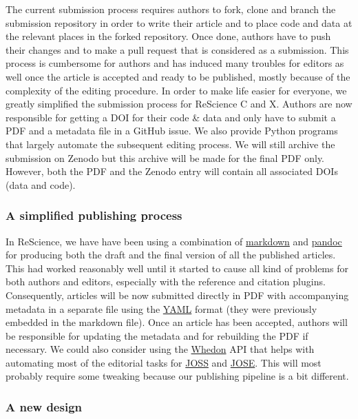 The current submission process requires authors to fork, clone and branch the
submission repository in order to write their article and to place code and
data at the relevant places in the forked repository. Once done, authors have
to push their changes and to make a pull request that is considered as a
submission. This process is cumbersome for authors and has induced many
troubles for editors as well once the article is accepted and ready to be
published, mostly because of the complexity of the editing procedure. In order
to make life easier for everyone, we greatly simplified the submission process
for ReScience C and X. Authors are now responsible for getting a DOI for their
code \& data and only have to submit a PDF and a metadata file in a GitHub
issue.
We also provide Python programs that largely automate the subsequent editing
process. We will still archive the submission on Zenodo but this archive will
be made for the final PDF only. However, both the PDF and the Zenodo entry will
contain all associated DOIs (data and code).


\subsubsection{A simplified publishing process}

In ReScience, we have have been using a combination of
\href{https://daringfireball.net/projects/markdown/syntax}{markdown} and
\href{http://pandoc.org/}{pandoc} for producing both the draft and the final
version of all the published articles. This had worked reasonably well until it
started to cause all kind of problems for both authors and editors, especially
with the reference and citation plugins. Consequently, articles will be now
submitted directly in PDF with accompanying metadata in a separate file using
the \href{https://en.wikipedia.org/wiki/YAML}{YAML} format (they were
previously embedded in the markdown file). Once an article has been accepted,
authors will be responsible for updating the metadata and for rebuilding the PDF if
necessary. We could also consider using the
\href{https://github.com/openjournals/whedon}{Whedon} API that helps with automating
most of the editorial tasks for \href{http://joss.theoj.org/}{JOSS} and
\href{http://jose.theoj.org/}{JOSE}. This will most probably require some
tweaking because our publishing pipeline is a bit different.


\subsubsection{A new design}

